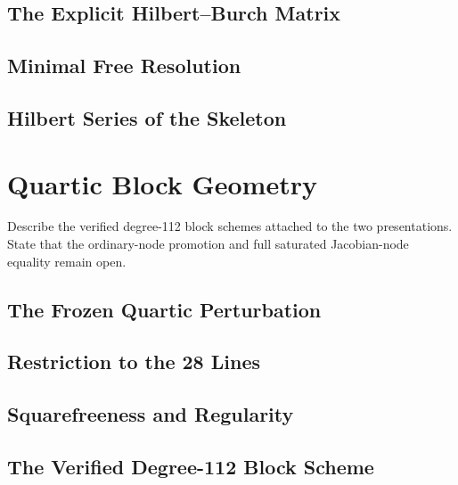 \subsection{The Explicit Hilbert--Burch Matrix}

\subsection{Minimal Free Resolution}

\subsection{Hilbert Series of the Skeleton}

\section{Quartic Block Geometry}\label{sec:block-geometry}


Describe the verified degree-112 block schemes attached to the two
presentations.  State that the ordinary-node promotion and full saturated
Jacobian-node equality remain open.

\subsection{The Frozen Quartic Perturbation}

\subsection{Restriction to the 28 Lines}

\subsection{Squarefreeness and Regularity}

\subsection{The Verified Degree-112 Block Scheme}


